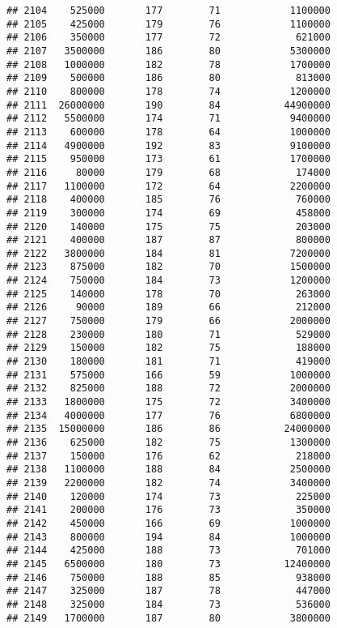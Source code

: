 \documentclass[
]{article}
\begin{document}
\begin{verbatim}
## 2104    525000       177        71            1100000
## 2105    425000       179        76            1100000
## 2106    350000       177        72             621000
## 2107   3500000       186        80            5300000
## 2108   1000000       182        78            1700000
## 2109    500000       186        80             813000
## 2110    800000       178        74            1200000
## 2111  26000000       190        84           44900000
## 2112   5500000       174        71            9400000
## 2113    600000       178        64            1000000
## 2114   4900000       192        83            9100000
## 2115    950000       173        61            1700000
## 2116     80000       179        68             174000
## 2117   1100000       172        64            2200000
## 2118    400000       185        76             760000
## 2119    300000       174        69             458000
## 2120    140000       175        75             203000
## 2121    400000       187        87             800000
## 2122   3800000       184        81            7200000
## 2123    875000       182        70            1500000
## 2124    750000       184        73            1200000
## 2125    140000       178        70             263000
## 2126     90000       189        66             212000
## 2127    750000       179        66            2000000
## 2128    230000       180        71             529000
## 2129    150000       182        75             188000
## 2130    180000       181        71             419000
## 2131    575000       166        59            1000000
## 2132    825000       188        72            2000000
## 2133   1800000       175        72            3400000
## 2134   4000000       177        76            6800000
## 2135  15000000       186        86           24000000
## 2136    625000       182        75            1300000
## 2137    150000       176        62             218000
## 2138   1100000       188        84            2500000
## 2139   2200000       182        74            3400000
## 2140    120000       174        73             225000
## 2141    200000       176        73             350000
## 2142    450000       166        69            1000000
## 2143    800000       194        84            1000000
## 2144    425000       188        73             701000
## 2145   6500000       180        73           12400000
## 2146    750000       188        85             938000
## 2147    325000       187        78             447000
## 2148    325000       184        73             536000
## 2149   1700000       187        80            3800000

\end{verbatim}
\end{document}
